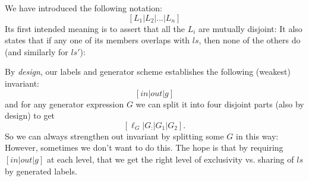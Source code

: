 \newpage
{}

We have introduced the following notation:
\[
  [ L_1 | L_2 | \dots | L_n ]
\]
Its first intended meaning is to assert that
all the $L_i$ are mutually disjoint:
It also states that if any one of its members overlaps with $ls$,
then none of the others do (and similarly for $ls'$):

By \emph{design}, our labels and generator scheme
establishes the following (weakest) invariant:
\[ [in|out|g]\]
and for any generator expression $G$ we can split it into
four disjoint parts (also by design) to get
\[  [\ell_G|G_{:}|G_1|G_2] . \]
So we can always strengthen out invariant by splitting some $G$
in this way:
However, sometimes we don't want to do this.
The hope is that by requiring $[in|out|g]$ at each level,
that we get the right level of exclusivity vs. sharing of $ls$
by generated labels.

\newpage
{}



